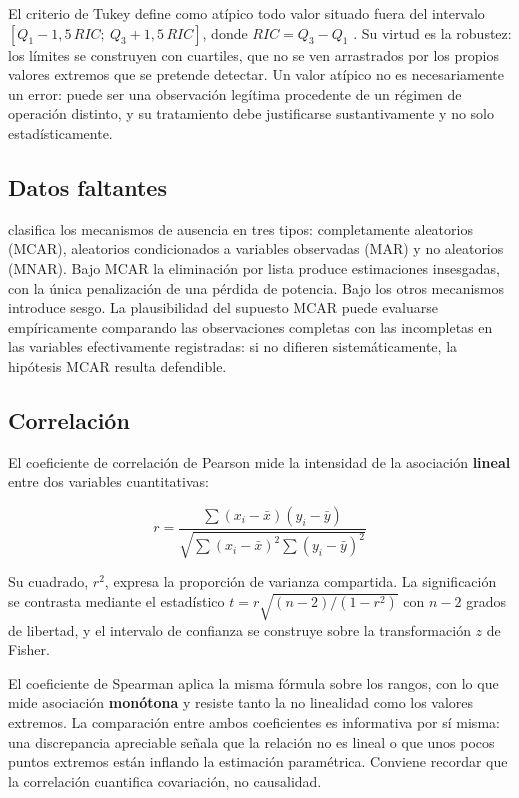 \documentclass[
]{book}
\begin{document}
El criterio de Tukey define como atípico todo valor situado fuera del intervalo
\([Q_1 - 1{,}5\,RIC;\ Q_3 + 1{,}5\,RIC]\), donde \(RIC = Q_3 - Q_1\) \citep{tukey1977}. Su virtud es
la robustez: los límites se construyen con cuartiles, que no se ven arrastrados por los
propios valores extremos que se pretende detectar. Un valor atípico no es necesariamente un
error: puede ser una observación legítima procedente de un régimen de operación distinto, y
su tratamiento debe justificarse sustantivamente y no solo estadísticamente.

\subsection{Datos faltantes}\label{datos-faltantes}

\citet{rubin1976} clasifica los mecanismos de ausencia en tres tipos: completamente aleatorios
(MCAR), aleatorios condicionados a variables observadas (MAR) y no aleatorios (MNAR). Bajo
MCAR la eliminación por lista produce estimaciones insesgadas, con la única penalización de
una pérdida de potencia. Bajo los otros mecanismos introduce sesgo. La plausibilidad del
supuesto MCAR puede evaluarse empíricamente comparando las observaciones completas con las
incompletas en las variables efectivamente registradas: si no difieren sistemáticamente, la
hipótesis MCAR resulta defendible.

\subsection{Correlación}\label{correlaciuxf3n}

El coeficiente de correlación de Pearson mide la intensidad de la asociación \textbf{lineal} entre
dos variables cuantitativas:

\[r = \frac{\sum (x_i - \bar{x})(y_i - \bar{y})}{\sqrt{\sum (x_i - \bar{x})^2 \sum (y_i - \bar{y})^2}}\]

Su cuadrado, \(r^2\), expresa la proporción de varianza compartida. La significación se contrasta
mediante el estadístico \(t = r\sqrt{(n-2)/(1-r^2)}\) con \(n-2\) grados de libertad, y el
intervalo de confianza se construye sobre la transformación \(z\) de Fisher.

El coeficiente de Spearman aplica la misma fórmula sobre los rangos, con lo que mide
asociación \textbf{monótona} y resiste tanto la no linealidad como los valores extremos. La
comparación entre ambos coeficientes es informativa por sí misma: una discrepancia apreciable
señala que la relación no es lineal o que unos pocos puntos extremos están inflando la
estimación paramétrica. Conviene recordar que la correlación cuantifica covariación, no
causalidad.
\end{document}
